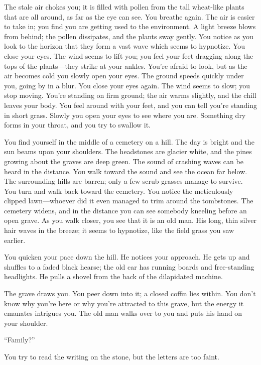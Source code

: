 The stale air chokes you; it is filled with pollen from the tall
wheat-like plants that are all around, as far as the eye can see. You
breathe again. The air is easier to take in; you find you are getting
used to the environment. A light breeze blows from behind; the pollen
dissipates, and the plants sway gently. You notice as you look to the
horizon that they form a vast wave which seems to hypnotize. You close
your eyes. The wind seems to lift you; you feel your feet dragging along
the tops of the plants---they strike at your ankles. You're afraid to
look, but as the air becomes cold you slowly open your eyes. The ground
speeds quickly under you, going by in a blur. You close your eyes again.
The wind seems to slow; you stop moving. You're standing on firm ground;
the air warms slightly, and the chill leaves your body. You feel around
with your feet, and you can tell you're standing in short grass. Slowly
you open your eyes to see where you are. Something dry forms in your
throat, and you try to swallow it.

You find yourself in the middle of a cemetery on a hill. The day is
bright and the sun beams upon your shoulders. The headstones are glacier
white, and the pines growing about the graves are deep green. The sound
of crashing waves can be heard in the distance. You walk toward the
sound and see the ocean far below. The surrounding hills are barren;
only a few scrub grasses manage to survive. You turn and walk back
toward the cemetery. You notice the meticulously clipped lawn---whoever
did it even managed to trim around the tombstones. The cemetery widens,
and in the distance you can see somebody kneeling before an open grave.
As you walk closer, you see that it is an old man. His long, thin silver
hair waves in the breeze; it seems to hypnotize, like the field grass
you saw earlier.

You quicken your pace down the hill. He notices your approach. He gets
up and shuffles to a faded black hearse; the old car has running boards
and free-standing headlights. He pulls a shovel from the back of the
dilapidated machine.

The grave draws you. You peer down into it; a closed coffin lies within.
You don't know why you're here or why you're attracted to this grave,
but the energy it emanates intrigues you. The old man walks over to you
and puts his hand on your shoulder.

``Family?''

You try to read the writing on the stone, but the letters are too faint.

